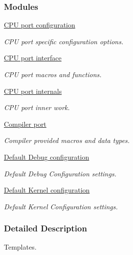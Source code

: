 \subsubsection*{Modules}
\begin{DoxyCompactItemize}
\item 
\hyperlink{group__template__cpu__cfg}{C\-P\-U port configuration}
\begin{DoxyCompactList}\small\item\em C\-P\-U port specific configuration options. \end{DoxyCompactList}\item 
\hyperlink{group__template__cpu__intf}{C\-P\-U port interface}
\begin{DoxyCompactList}\small\item\em C\-P\-U port macros and functions. \end{DoxyCompactList}\item 
\hyperlink{group__template__cpu__impl}{C\-P\-U port internals}
\begin{DoxyCompactList}\small\item\em C\-P\-U port inner work. \end{DoxyCompactList}\item 
\hyperlink{group__template__compiler}{Compiler port}
\begin{DoxyCompactList}\small\item\em Compiler provided macros and data types. \end{DoxyCompactList}\item 
\hyperlink{group__template__dbg__cfg}{Default Debug configuration}
\begin{DoxyCompactList}\small\item\em Default Debug Configuration settings. \end{DoxyCompactList}\item 
\hyperlink{group__template__kern__cfg}{Default Kernel configuration}
\begin{DoxyCompactList}\small\item\em Default Kernel Configuration settings. \end{DoxyCompactList}\end{DoxyCompactItemize}


\subsubsection{Detailed Description}
Templates. 